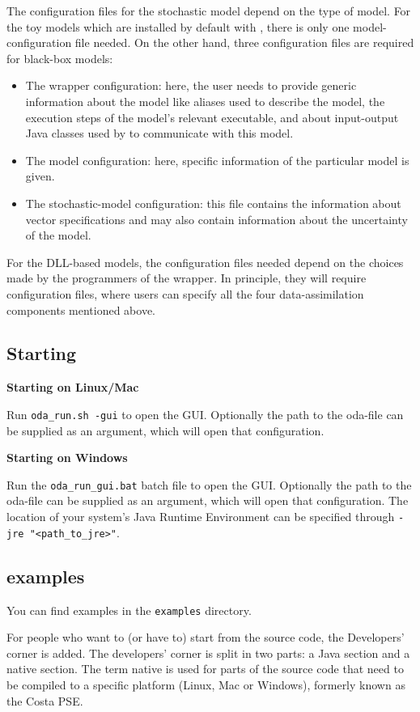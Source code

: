 The configuration files for the stochastic model depend on the type of model. For the toy models which are installed by default with \oda, there is only one model-configuration file needed. On the other hand, three configuration files are required for black-box models: 
\begin{itemize}
\item The wrapper configuration: here, the user needs to provide generic information about the model like aliases used to describe the model, the execution steps of the model’s relevant executable, and about input-output Java classes used by \oda to communicate with this model.
\item The model configuration: here, specific information of the particular model is given.
\item The stochastic-model configuration: this file contains the information about vector specifications and may also contain information about the uncertainty of the model. 
\end{itemize}
For the DLL-based models, the configuration files needed depend on the choices made by the programmers of the \oda wrapper. In principle, they will require configuration files, where users can specify all the four data-assimilation components mentioned above. 

\subsection{Starting \oda}
\textbf{Starting \oda on Linux/Mac}

Run \verb|oda_run.sh -gui| to open the \oda GUI. Optionally the path to the oda-file can be supplied as an argument, which will open that \oda configuration.

\textbf{Starting \oda on Windows}

Run the \verb|oda_run_gui.bat| batch file to open the \oda GUI. Optionally the path to the oda-file can be supplied as an argument, which will open that \oda configuration. The location of your system's Java Runtime Environment can be specified through \verb|-jre "<path_to_jre>"|.

\subsection{\oda examples}
You can find examples in the \verb|examples| directory.

For people who want to (or have to) start from the \oda source code, the Developers' corner is added. The developers' corner is split in two parts: a Java section and a native section. The term native is used for parts of the source code that need to be compiled to a specific platform (Linux, Mac or Windows), formerly known as the Costa PSE.


